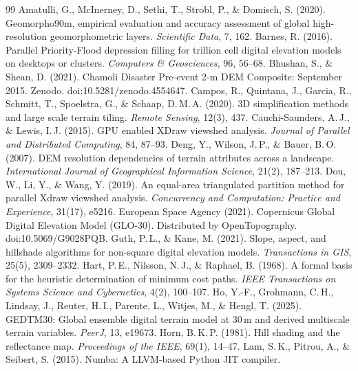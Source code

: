 \documentclass[11pt,a4paper]{article}
\begin{document}
\begin{thebibliography}{99}\footnotesize\setlength{\itemsep}{1pt}
 Amatulli, G., McInerney, D., Sethi, T., Strobl, P., \& Domisch, S. (2020). Geomorpho90m,
empirical evaluation and accuracy assessment of global high-resolution geomorphometric layers. \emph{Scientific
Data}, 7, 162.
 Barnes, R. (2016). Parallel Priority-Flood depression filling for trillion cell digital elevation
models on desktops or clusters. \emph{Computers \& Geosciences}, 96, 56--68.
 Bhushan, S., \& Shean, D. (2021). Chamoli Disaster Pre-event 2-m DEM Composite: September 2015.
Zenodo. doi:10.5281/zenodo.4554647.
 Campos, R., Quintana, J., Garcia, R., Schmitt, T., Spoelstra, G., \& Schaap, D.\,M.\,A. (2020). 3D
simplification methods and large scale terrain tiling. \emph{Remote Sensing}, 12(3), 437.
 Cauchi-Saunders, A.\,J., \& Lewis, I.\,J. (2015). GPU enabled XDraw viewshed analysis.
\emph{Journal of Parallel and Distributed Computing}, 84, 87--93.
 Deng, Y., Wilson, J.\,P., \& Bauer, B.\,O. (2007). DEM resolution dependencies of terrain attributes
across a landscape. \emph{International Journal of Geographical Information Science}, 21(2), 187--213.
 Dou, W., Li, Y., \& Wang, Y. (2019). An equal-area triangulated partition method for parallel Xdraw
viewshed analysis. \emph{Concurrency and Computation: Practice and Experience}, 31(17), e5216.
 European Space Agency (2021). Copernicus Global Digital Elevation Model (GLO-30). Distributed by
OpenTopography. doi:10.5069/G9028PQB.
 Guth, P.\,L., \& Kane, M. (2021). Slope, aspect, and hillshade algorithms for non-square digital
elevation models. \emph{Transactions in GIS}, 25(5), 2309--2332.
 Hart, P.\,E., Nilsson, N.\,J., \& Raphael, B. (1968). A formal basis for the heuristic determination
of minimum cost paths. \emph{IEEE Transactions on Systems Science and Cybernetics}, 4(2), 100--107.
 Ho, Y.-F., Grohmann, C.\,H., Lindsay, J., Reuter, H.\,I., Parente, L., Witjes, M., \& Hengl, T.
(2025). GEDTM30: Global ensemble digital terrain model at 30\,m and derived multiscale terrain variables.
\emph{PeerJ}, 13, e19673.
 Horn, B.\,K.\,P. (1981). Hill shading and the reflectance map. \emph{Proceedings of the IEEE},
69(1), 14--47.
 Lam, S.\,K., Pitrou, A., \& Seibert, S. (2015). Numba: A LLVM-based Python JIT compiler.

\end{thebibliography}
\end{document}
